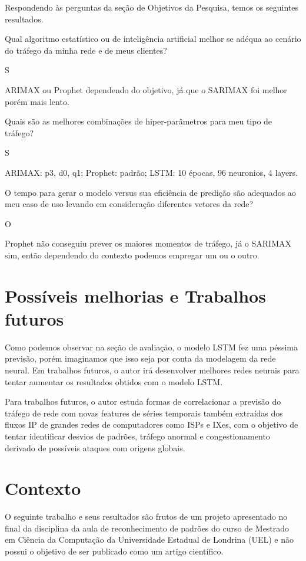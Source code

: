 \documentclass[12pt]{article}
\newcommand{\SubItem}[1]{
    {\setlength\itemindent{15pt} \item[-] #1}
}
\begin{document}
Respondendo às perguntas da seção de Objetivos da Pesquisa, temos os seguintes resultados.

\begin{itemize}
  \item Qual algoritmo estatístico ou de inteligência artificial melhor se adéqua ao cenário do tráfego da minha rede e de meus clientes?
    \SubItem SARIMAX ou Prophet dependendo do objetivo, já que o SARIMAX foi melhor porém mais lento.
  \item Quais são as melhores combinações de hiper-parâmetros para meu tipo de tráfego?
    \SubItem SARIMAX: p3, d0, q1; Prophet: padrão; LSTM: 10 épocas, 96 neuronios, 4 layers.
  \item O tempo para gerar o modelo versus sua eficiência de predição são adequados ao meu caso de uso levando em consideração diferentes vetores da rede?
    \SubItem O Prophet não conseguiu prever os maiores momentos de tráfego, já o SARIMAX sim, então dependendo do contexto podemos empregar um ou o outro.
\end{itemize}

\section{Possíveis melhorias e Trabalhos futuros}

Como podemos observar na seção de avaliaçăo, o modelo LSTM fez uma péssima previsão, porém imaginamos que isso seja por conta da modelagem da rede neural. Em trabalhos futuros, o autor irá desenvolver melhores redes neurais para tentar aumentar os resultados obtidos com o modelo LSTM.

Para trabalhos futuros, o autor estuda formas de correlacionar a previsão do tráfego de rede com novas features de séries temporais também extraídas dos fluxos IP de grandes redes de computadores como ISPs e IXes, com o objetivo de tentar identificar desvios de padrões, tráfego anormal e congestionamento derivado de possíveis ataques com origens globais.

\section{Contexto}

O seguinte trabalho e seus resultados são frutos de um projeto apresentado no final da disciplina da aula de reconhecimento de padrões do curso de Mestrado em Ciência da Computação da Universidade Estadual de Londrina (UEL) e não possui o objetivo de ser publicado como um artigo científico.

\newpage
\printbibliography
\end{document}
